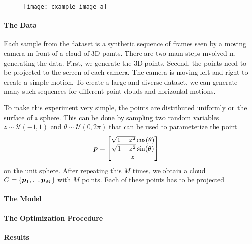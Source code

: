 		\begin{figure}[tb]
			\centering
			\texttt{[image: example-image-a]}
			\caption[]
					{}
			\label{}
		\end{figure}
	
		\paragraph{The Data}
		Each sample from the dataset is a synthetic sequence of frames seen by a moving camera in front of a cloud of 3D points.
		There are two main steps involved in generating the data.
		First, we generate the 3D points.
		Second, the points need to be projected to the screen of each camera.
		The camera is moving left and right to create a simple motion.
		To create a large and diverse dataset, we can generate many such sequences for different point clouds and horizontal motions.
		
		To make this experiment very simple, the points are distributed uniformly on the surface of a sphere.
		This can be done by sampling two random variables $z \sim \mathcal{U}(-1, 1)$ and $\theta \sim \mathcal{U}(0, 2\pi)$ that can be used to parameterize the point
		\begin{equation}
			\bm{p} = 
			\begin{bmatrix}
				\sqrt{1 - z^2} \cos(\theta) \\ 
				\sqrt{1 - z^2} \sin(\theta) \\
				z
			\end{bmatrix}
		\end{equation}
		on the unit sphere. 
		After repeating this $M$ times, we obtain a cloud $C = \{\vectr{p}_1, \dots \vectr{p}_M\}$ with $M$ points.
		Each of these points has to be projected
		
		
		\paragraph{The Model}
		
		\paragraph{The Optimization Procedure}
		
		\paragraph{Results}
		
		\paragraph{}
	